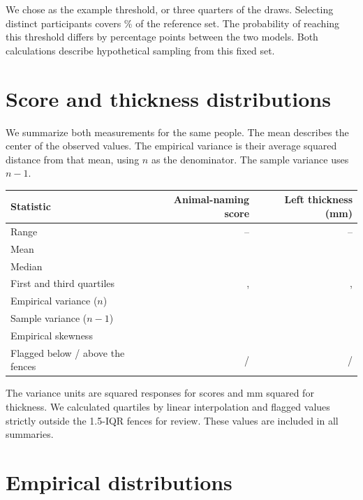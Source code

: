 \documentclass[11pt]{article}
\begin{document}
We chose \TailMin{} as the example threshold, or three quarters of the
draws. Selecting \DrawN{} distinct participants covers \DrawFraction{}\%
of the reference set. The probability of reaching this threshold differs
by \TailGap{} percentage points between the two models. Both calculations
describe hypothetical sampling from this fixed set.

\section{Score and thickness distributions}
We summarize both measurements for the same \PairedN{} people.
The mean describes the center of the observed values. The empirical
variance is their average squared distance from that mean, using $n$
as the denominator. The sample variance uses $n-1$.

\begin{center}\small
\begin{tabular}{@{}lrr@{}}
\toprule
Statistic & Animal-naming score & Left thickness (mm) \\
\midrule
Range & \ScoreMin{}--\ScoreMax{} & \ThicknessMin{}--\ThicknessMax{} \\
Mean & \ScoreMean{} & \ThicknessMean{} \\
Median & \ScoreMedian{} & \ThicknessMedian{} \\
First and third quartiles & \ScoreFirstQuartile{}, \ScoreThirdQuartile{} &
\ThicknessFirstQuartile{}, \ThicknessThirdQuartile{} \\
Empirical variance ($n$) & \ScoreEmpVar{} & \ThicknessEmpVar{} \\
Sample variance ($n-1$) & \ScoreSampleVar{} & \ThicknessSampleVar{} \\
Empirical skewness & \ScoreSkew{} & \ThicknessSkew{} \\
Flagged below / above the fences & \ScoreLowFlags{} / \ScoreHighFlags{} &
\ThicknessLowFlags{} / \ThicknessHighFlags{} \\
\bottomrule
\end{tabular}
\end{center}

The variance units are squared responses for scores and mm squared for
thickness. We calculated quartiles by linear interpolation and flagged
values strictly outside the 1.5-IQR fences for review. These values are
included in all summaries.

\clearpage
\section{Empirical distributions}
\end{document}
